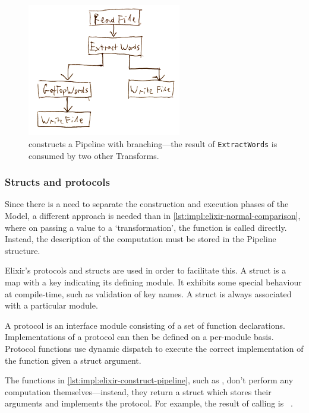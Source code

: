 \begin{figure}[h]
	\centering
	\includegraphics[width=0.6\textwidth]{images/temp/dsl-branching-pipeline}
	\caption[A branching Pipeline constructed in \cref{lst:impl:diverging-pipelines}.]{ constructs a Pipeline with branching---the result of \texttt{ExtractWords} is consumed by two other Transforms.}
	\label{fig:impl:dsl-branching-pipeline}
\end{figure}

\subsubsection{Structs and protocols}

Since there is a need to separate the construction and execution phases of the Model, a different approach is needed than in \cref{lst:impl:elixir-normal-comparison}, where on passing a value to a `transformation', the function is called directly.
Instead, the description of the computation must be stored in the Pipeline structure.

Elixir's protocols and structs are used in order to facilitate this.
A struct is a map with a  key indicating its defining module.
It exhibits some special behaviour at compile-time, such as validation of key names.
A struct is always associated with a particular module.

A protocol is an interface module consisting of a set of function declarations.
Implementations of a protocol can then be defined on a per-module basis.
Protocol functions use dynamic dispatch to execute the correct implementation of the function given a struct argument.

\begin{sloppypar}
The functions in \cref{lst:impl:elixir-construct-pipeline}, such as , don't perform any computation themselves---instead, they return a struct which stores their arguments and implements the  protocol.
For example, the result of calling  is \texttt{%
}.
\end{sloppypar}


